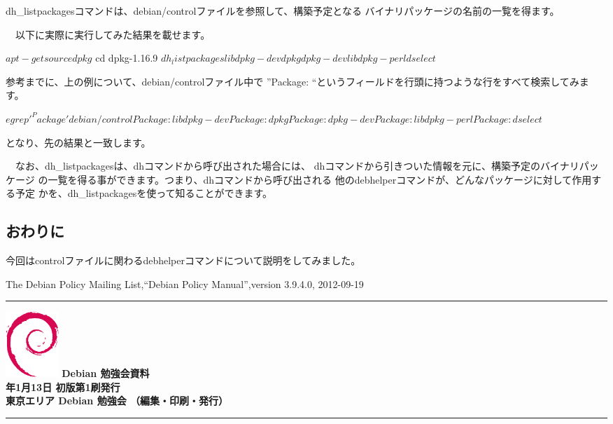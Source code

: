 \documentclass[mingoth,a4paper]{jsarticle}
\newcommand{\debmtgyear}{2013}
\newcommand{\debmtgmonth}{1}
\newcommand{\debmtgdate}{13}
\begin{document}
 dh\_listpackagesコマンドは、debian/controlファイルを参照して、構築予定となる
バイナリパッケージの名前の一覧を得ます。

　以下に実際に実行してみた結果を載せます。

\begin{commandline}
$ apt-get source dpkg
$ cd dpkg-1.16.9
$ dh_listpackages
libdpkg-dev
dpkg
dpkg-dev
libdpkg-perl
dselect
$
\end{commandline}

参考までに、上の例について、debian/controlファイル中で
''Package: ``というフィールドを行頭に持つような行をすべて検索してみます。

\begin{commandline}
$ egrep '^Package' debian/control
Package: libdpkg-dev
Package: dpkg
Package: dpkg-dev
Package: libdpkg-perl
Package: dselect
$ 
\end{commandline}

となり、先の結果と一致します。

　なお、dh\_listpackagesは、dhコマンドから呼び出された場合には、
dhコマンドから引きついた情報を元に、構築予定のバイナリパッケージ
の一覧を得る事ができます。つまり、dhコマンドから呼び出される
他のdebhelperコマンドが、どんなパッケージに対して作用する予定
かを、dh\_listpackagesを使って知ることができます。

\subsection{おわりに}

 今回はcontrolファイルに関わるdebhelperコマンドについて説明をしてみました。

\begin{thebibliography}{99}
 The Debian Policy Mailing List,``Debian Policy Manual'',version 3.9.4.0, 2012-09-19
\end{thebibliography}
\printindex

\cleartooddpage

\vspace*{15cm}
\hrule
\vspace{2mm}
\includegraphics[width=2cm]{image200502/openlogo-nd.eps}
\noindent \Large \bf Debian 勉強会資料\\
\noindent \normalfont \debmtgyear{}年\debmtgmonth{}月\debmtgdate{}日 \hspace{5mm}  初版第1刷発行\\
\noindent \normalfont 東京エリア Debian 勉強会 （編集・印刷・発行）\\
\hrule
\end{document}
